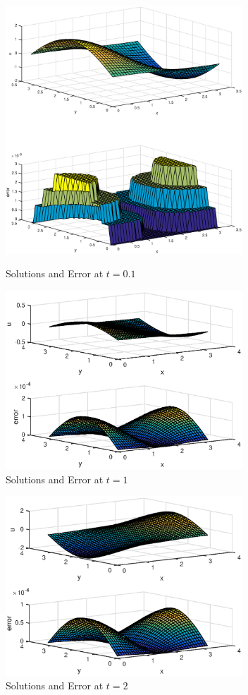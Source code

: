 \begin{figure}
\centering
\includegraphics[width=3.5in]{csolnt01}
\caption{Solutions and Error at $t=0.1$}
\includegraphics[width=3.5in]{csolnt1}\\
\caption{Solutions and Error at $t=1$}
\includegraphics[width=3.5in]{csolnt2}
\caption{Solutions and Error at $t=2$}
\end{figure}
\eenum



